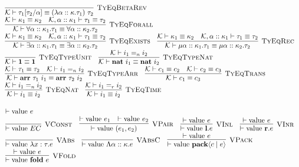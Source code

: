 \documentclass[fleqn]{article}
\begin{document}
\[\begin{array}{l}
    \infer[\textsc{TyEqBetaRev}]{\mathcal{K} \vdash \tau_1[\tau_2/\alpha] \equiv (\lambda \alpha :: \kappa. \tau_1)~\tau_2}{} \\
    \infer[\textsc{TyEqForall}]{\mathcal{K} \vdash \forall \alpha :: \kappa_1. \tau_1 \equiv \forall \alpha :: \kappa_2. \tau_2}{\mathcal{K} \vdash \kappa_1 \equiv \kappa_2 & \mathcal{K},\alpha :: \kappa_1 \vdash \tau_1 \equiv \tau_2} \\
    \infer[\textsc{TyEqExists}]{\mathcal{K} \vdash \exists \alpha :: \kappa_1. \tau_1 \equiv \exists \alpha :: \kappa_2. \tau_2}{\mathcal{K} \vdash \kappa_1 \equiv \kappa_2 & \mathcal{K},\alpha :: \kappa_1 \vdash \tau_1 \equiv \tau_2} \hspace{1em}
    \infer[\textsc{TyEqRec}]{\mathcal{K} \vdash \mu \alpha :: \kappa_1. \tau_1 \equiv \mu \alpha :: \kappa_2. \tau_2}{\mathcal{K} \vdash \kappa_1 \equiv \kappa_2 & \mathcal{K},\alpha :: \kappa_1 \vdash \tau_1 \equiv \tau_2} \\
    \infer[\textsc{TyEqTypeUnit}]{\mathcal{K} \vdash \mathbf{1} \equiv \mathbf{1}}{} \hspace{1em}
    \infer[\textsc{TyEqTypeNat}]{\mathcal{K} \vdash \mathbf{nat}~i_1 \equiv \mathbf{nat}~i_2}{\mathcal{K} \vdash i_1 =_n i_2} \\
    \infer[\textsc{TyEqTypeArr}]{\mathcal{K} \vdash \mathbf{arr}~\tau_1~i_1 \equiv \mathbf{arr}~\tau_2~i_2}{\mathcal{K} \vdash \tau_1 \equiv \tau_2 & \mathcal{K} \vdash i_1 =_n i_2} \hspace{1em}
    \infer[\textsc{TyEqTrans}]{\mathcal{K} \vdash c_1 \equiv c_3}{\mathcal{K} \vdash c_1 \equiv c_2 & \mathcal{K} \vdash c_2 \equiv c_3} \\
    \infer[\textsc{TyEqNat}]{\mathcal{K} \vdash i_1 \equiv i_2}{\mathcal{K} \vdash i_1 =_n i_2} \hspace{1em}
    \infer[\textsc{TyEqTime}]{\mathcal{K} \vdash i_1 \equiv i_2}{\mathcal{K} \vdash i_1 =_r i_2}
\end{array}
\]

\[
\begin{array}{l}
    \vdash \mathrm{value}~e \\
    \infer[\textsc{VConst}]{\vdash \mathrm{value}~EC}{} \hspace{1em}
    \infer[\textsc{VPair}]{\vdash \mathrm{value}~(e_1,e_2)}{\vdash \mathrm{value}~e_1 & \vdash \mathrm{value}~e_2} \hspace{1em}
    \infer[\textsc{VInl}]{\vdash \mathrm{value}~\mathbf{l}.e}{\vdash \mathrm{value}~e} \hspace{1em}
    \infer[\textsc{VInr}]{\vdash \mathrm{value}~\mathbf{r}.e}{\vdash \mathrm{value}~e} \\
    \infer[\textsc{VAbs}]{\vdash \mathrm{value}~\lambda x : \tau.e}{} \hspace{1em}
    \infer[\textsc{VAbsC}]{\vdash \mathrm{value}~\Lambda \alpha :: \kappa.e}{} \hspace{1em}
    \infer[\textsc{VPack}]{\vdash \mathrm{value}~\mathbf{pack}\langle c \mid e \rangle}{\vdash \mathrm{value}~e} \\
    \infer[\textsc{VFold}]{\vdash \mathrm{value}~\mathbf{fold}~e}{\vdash \mathrm{value}~e}
\end{array}
\]
\end{document}
